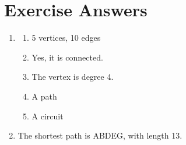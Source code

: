 \section{Exercise Answers}
\begin{enumerate}[label={}, leftmargin=3.5em, labelwidth=3em, align=left]
\item[Exercise~\ref{ex:5cities}] \begin{enumerate}
\item 5 vertices, 10 edges
\item Yes, it is connected.
\item The vertex is degree 4.
\item A path
\item  A circuit\\
\end{enumerate}

\item[Exercise~\ref{ex:shortest-path}] The shortest path is ABDEG, with length 13.\\



\end{enumerate}
